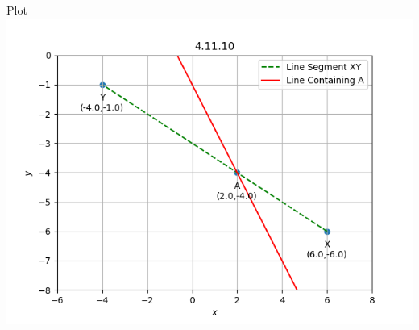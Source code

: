 \documentclass{beamer}
\begin{document}
\begin{frame}{Plot}
    \centering
    \includegraphics[width=\columnwidth, height=0.8\textheight, keepaspectratio]{../figs/section1.png}   
\end{frame}
\end{document}
